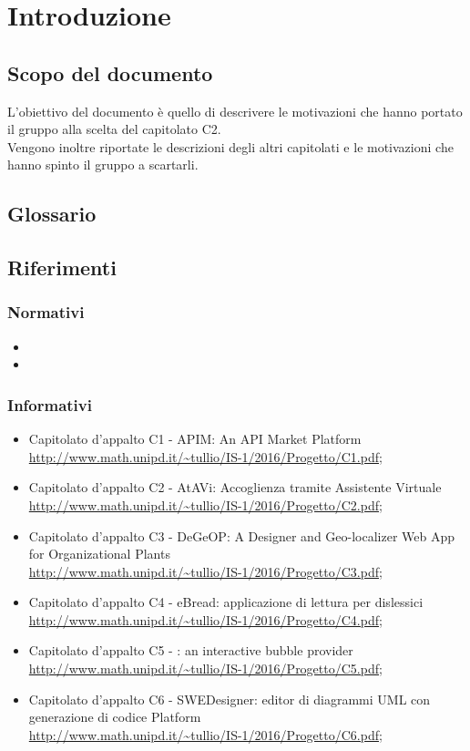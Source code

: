 \section {Introduzione}
	\subsection {Scopo del documento}
		L'obiettivo del documento è quello di descrivere le motivazioni che hanno portato il gruppo \GRUPPO{} alla scelta del capitolato C2.  \\
		Vengono inoltre riportate le descrizioni degli altri capitolati e le motivazioni che hanno spinto il gruppo a scartarli.
	\subsection {Glossario}
		\GLOSSARIO
	\subsection {Riferimenti}
		\subsubsection {Normativi}
			\begin {itemize}
				\item \NPdoc
				\item \GldocRR
			\end {itemize}
		\subsubsection {Informativi}
			\begin {itemize}
				\item Capitolato d'appalto C1 - APIM: An API Market Platform \\
					\url {http://www.math.unipd.it/~tullio/IS-1/2016/Progetto/C1.pdf};
				\item Capitolato d'appalto C2 - AtAVi: Accoglienza tramite Assistente Virtuale \\
				\url {http://www.math.unipd.it/~tullio/IS-1/2016/Progetto/C2.pdf};
				\item Capitolato d'appalto C3 - DeGeOP: A Designer and Geo-localizer Web App for Organizational Plants \\
					\url {http://www.math.unipd.it/~tullio/IS-1/2016/Progetto/C3.pdf};
					\item Capitolato d'appalto C4 - eBread: applicazione di lettura per dislessici  \\
					\url {http://www.math.unipd.it/~tullio/IS-1/2016/Progetto/C4.pdf};
					\item Capitolato d'appalto C5 - : an interactive bubble provider \\
					\url {http://www.math.unipd.it/~tullio/IS-1/2016/Progetto/C5.pdf};
					\item Capitolato d'appalto C6 - SWEDesigner: editor di diagrammi UML con generazione di codice Platform \\
					\url {http://www.math.unipd.it/~tullio/IS-1/2016/Progetto/C6.pdf};
					
				
			\end {itemize}
		
		